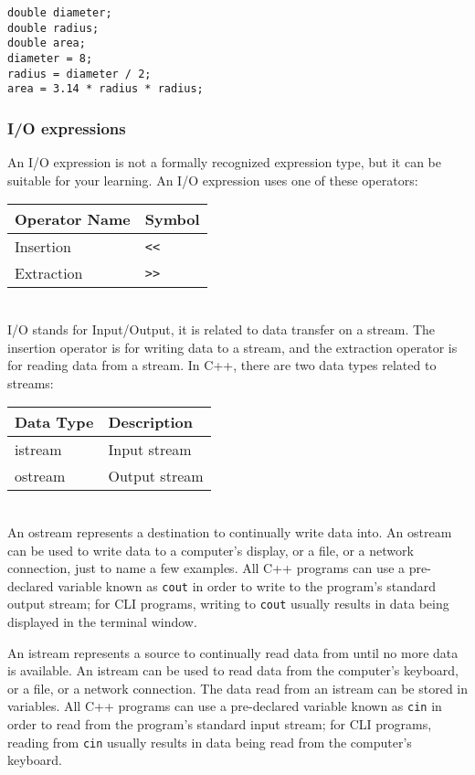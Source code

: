 \documentclass[a4paper,12pt]{article}
\begin{document}
\begin{lstlisting}[caption=Example of arithmetic expressions]
double diameter;
double radius;
double area;
diameter = 8;
radius = diameter / 2;
area = 3.14 * radius * radius;
\end{lstlisting}

\subsubsection*{I/O expressions}

An I/O expression is not a formally recognized expression type, but it can be suitable for your learning. An I/O expression uses one of these operators: \\

\begin{tabular}{|l|l|}
\hline
Operator Name & Symbol \\
\hline
Insertion & \texttt{<<} \\
\hline
Extraction & \texttt{>>} \\
\hline
\end{tabular} \\

I/O stands for Input/Output, it is related to data transfer on a stream. The insertion operator is for writing data to a stream, and the extraction operator is for reading data from a stream. In C++, there are two data types related to streams: \\

\begin{tabular}{|l|l|}
\hline
Data Type & Description \\
\hline
istream & Input stream \\
\hline
ostream & Output stream \\
\hline
\end{tabular} \\

An ostream represents a destination to continually write data into. An ostream can be used to write data to a computer's display, or a file, or a network connection, just to name a few examples. All C++ programs can use a pre-declared variable known as \texttt{cout} in order to write to the program's standard output stream; for CLI programs, writing to \texttt{cout} usually results in data being displayed in the terminal window.

An istream represents a source to continually read data from until no more data is available. An istream can be used to read data from the computer's keyboard, or a file, or a network connection. The data read from an istream can be stored in variables. All C++ programs can use a pre-declared variable known as \texttt{cin} in order to read from the program's standard input stream; for CLI programs, reading from \texttt{cin} usually results in data being read from the computer's keyboard.
\end{document}
